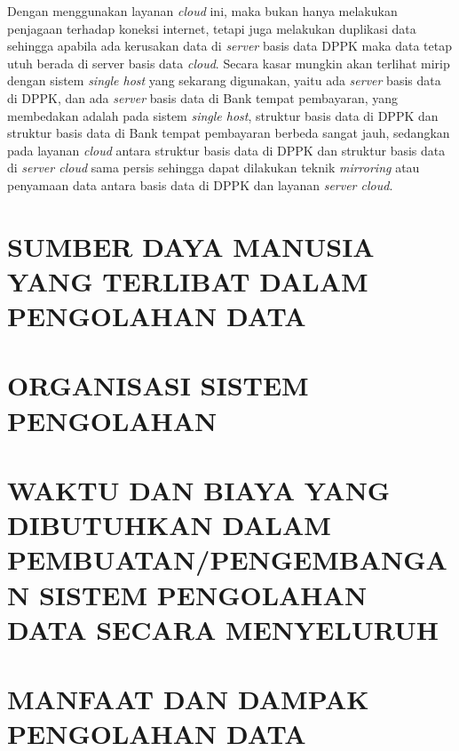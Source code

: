 \documentclass[pdftex,12pt, oneside]{article}
\begin{document}
\begin{enumerate}
Dengan menggunakan layanan \textit{cloud} ini, maka bukan hanya melakukan penjagaan terhadap koneksi internet, tetapi juga melakukan duplikasi data sehingga apabila ada kerusakan data di \textit{server} basis data DPPK maka data tetap utuh berada di server basis data \textit{cloud}. Secara kasar mungkin akan terlihat mirip dengan sistem \textit{single host} yang sekarang digunakan, yaitu ada \textit{server} basis data di DPPK, dan ada \textit{server} basis data di Bank tempat pembayaran, yang membedakan adalah pada sistem \textit{single host}, struktur basis data di DPPK dan struktur basis data di Bank tempat pembayaran berbeda sangat jauh, sedangkan pada layanan \textit{cloud} antara struktur basis data di DPPK dan struktur basis data di \textit{server cloud} sama persis sehingga dapat dilakukan teknik \textit{mirroring} atau penyamaan data antara basis data di DPPK dan layanan \textit{server cloud}.

\end{enumerate}


\section{SUMBER DAYA MANUSIA YANG TERLIBAT DALAM PENGOLAHAN DATA}


\section{ORGANISASI SISTEM PENGOLAHAN}


\section{WAKTU DAN BIAYA YANG DIBUTUHKAN DALAM PEMBUATAN/PENGEMBANGAN SISTEM PENGOLAHAN DATA SECARA MENYELURUH}


\section{MANFAAT DAN DAMPAK PENGOLAHAN DATA}
\end{document}

